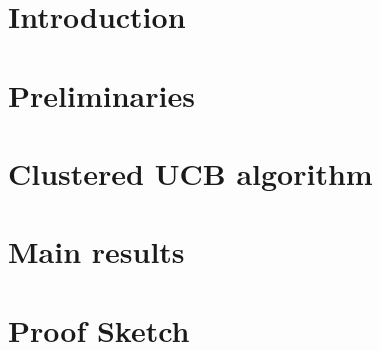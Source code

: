\documentclass[twoside]{article}
\begin{document}
\begin{abstract}

\end{abstract}

\section{Introduction}
\label{sec:intro}





\section{Preliminaries}
\label{sec:prelims}

	


\section{Clustered UCB algorithm}
\label{sec:clusucb}


\section{Main results}
\label{sec:results}


\section{Proof Sketch}
\label{sec:proofSketch}

\end{document}
